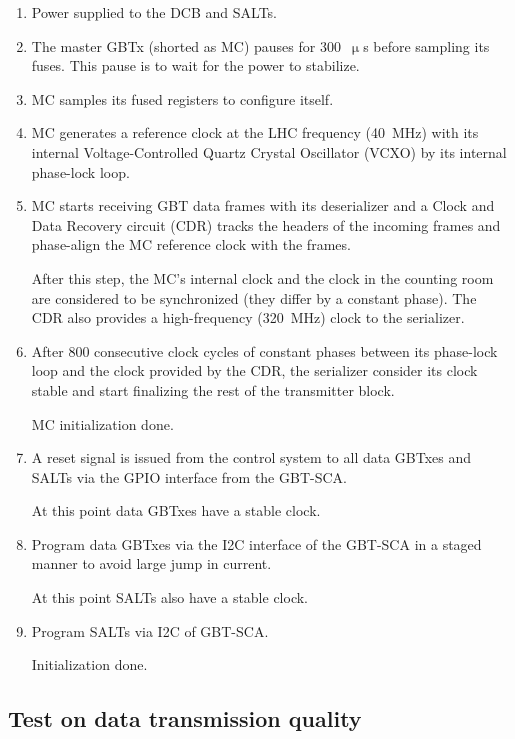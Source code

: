 \begin{enumerate}
    \item Power supplied to the DCB and SALTs.
    \item The master GBTx (shorted as MC) pauses for 300~$\upmu$s before
        sampling its fuses. This pause is to wait for the power to stabilize.
    \item MC samples its fused registers to configure itself.
    \item MC generates a reference clock at the LHC frequency (40~MHz) with
        its internal Voltage-Controlled Quartz Crystal Oscillator (VCXO)
        by its internal phase-lock loop.
    \item MC starts receiving GBT data frames with its deserializer and a Clock
        and Data Recovery circuit (CDR) tracks the headers of the incoming
        frames and phase-align the MC reference clock with the frames.

        After this step, the MC's internal clock and the clock in the counting
        room are considered to be synchronized
        (they differ by a constant phase).
        The CDR also provides a high-frequency (320~MHz) clock to the
        serializer.
    \item
        After 800 consecutive clock cycles of constant phases between its
        phase-lock loop and the clock provided by the CDR,
        the serializer consider its clock stable and start finalizing the rest
        of the transmitter block.

        MC initialization done.

    \item A reset signal is issued from the control system to all data GBTxes
        and SALTs via the GPIO interface from the GBT-SCA.

        At this point data GBTxes have a stable clock.

    \item Program data GBTxes via the I2C interface of the GBT-SCA in a staged
        manner to avoid large jump in current.

        At this point SALTs also have a stable clock.

    \item Program SALTs via I2C of GBT-SCA.

        Initialization done.
\end{enumerate}


\subsection{Test on data transmission quality}
\label{dcb-test-data}

